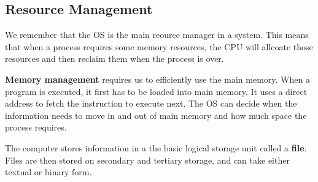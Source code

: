 \documentclass{tufte-handout}
\begin{document}
\subsection{Resource Management}
We remember that the OS is the main reource manager in a system. This means that when
a process requires some memory resources, the CPU will allcoate those resources and then 
reclaim them when the process is over.

\textbf{Memory management} requires us to efficiently use the main memory. When a program
is executed, it first has to be loaded into main memory. It uses a direct address to fetch
the instruction to execute next. The OS can decide when the information needs to move in
and out of main memory and how much space the process requires.

The computer stores information in a the basic logical storage unit called a \textbf{file}.
Files are then stored on secondary and tertiary storage, and can take either textual
or binary form.
\end{document}
